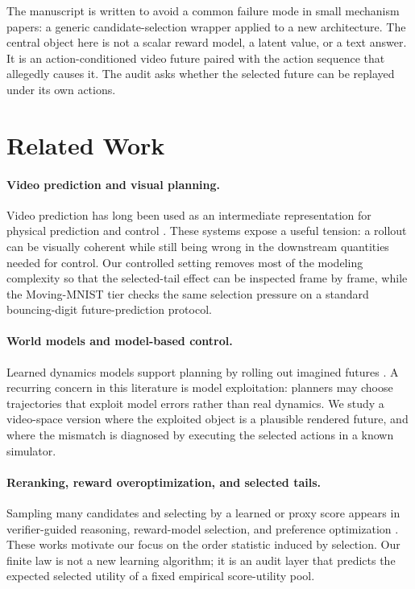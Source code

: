 \documentclass{article}
\begin{document}
The manuscript is written to avoid a common failure mode in small mechanism papers: a generic candidate-selection wrapper applied to a new architecture. The central object here is not a scalar reward model, a latent value, or a text answer. It is an action-conditioned video future paired with the action sequence that allegedly causes it. The audit asks whether the selected future can be replayed under its own actions.

\section{Related Work}

\paragraph{Video prediction and visual planning.}
Video prediction has long been used as an intermediate representation for physical prediction and control \citep{srivastava2015unsupervised,finn2016unsupervised,babaeizadeh2018stochastic,villegas2017learning,ebert2018visualforesight}. These systems expose a useful tension: a rollout can be visually coherent while still being wrong in the downstream quantities needed for control. Our controlled setting removes most of the modeling complexity so that the selected-tail effect can be inspected frame by frame, while the Moving-MNIST tier checks the same selection pressure on a standard bouncing-digit future-prediction protocol.

\paragraph{World models and model-based control.}
Learned dynamics models support planning by rolling out imagined futures \citep{chua2018deep,hafner2019planet,hafner2020dreamer,schrittwieser2020mastering,hafner2023mastering}. A recurring concern in this literature is model exploitation: planners may choose trajectories that exploit model errors rather than real dynamics. We study a video-space version where the exploited object is a plausible rendered future, and where the mismatch is diagnosed by executing the selected actions in a known simulator.

\paragraph{Reranking, reward overoptimization, and selected tails.}
Sampling many candidates and selecting by a learned or proxy score appears in verifier-guided reasoning, reward-model selection, and preference optimization \citep{stiennon2020learning,cobbe2021training,gao2022scaling}. These works motivate our focus on the order statistic induced by selection. Our finite law is not a new learning algorithm; it is an audit layer that predicts the expected selected utility of a fixed empirical score-utility pool.
\end{document}
